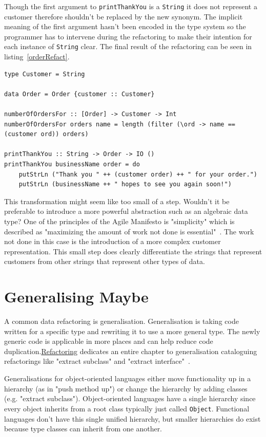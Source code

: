 Though the first argument to \texttt{printThankYou} is a \texttt{String} it does not represent a customer therefore shouldn't be replaced by the new synonym. The implicit meaning of the first argument hasn't been encoded in the type system so the programmer has to intervene during the refactoring to make their intention for each instance of \texttt{String} clear. The final result of the refactoring can be seen in listing~\ref{orderRefact}. 

\begin{lstlisting}[label=orderRefact,caption={The final result after adding a synonym for String.}]
type Customer = String

data Order = Order {customer :: Customer}

numberOfOrdersFor :: [Order] -> Customer -> Int
numberOfOrdersFor orders name = length (filter (\ord -> name == (customer ord)) orders)

printThankYou :: String -> Order -> IO ()
printThankYou businessName order = do
	putStrLn ("Thank you " ++ (customer order) ++ " for your order.")
	putStrLn (businessName ++ " hopes to see you again soon!")
\end{lstlisting}

 This transformation might seem like too small of a step. Wouldn't it be preferable to introduce a more powerful abstraction such as an algebraic data type? One of the principles of the Agile Manifesto is "simplicity" which is described as "maximizing the amount of work not done is essential"~\cite{agileManifesto}. The work not done in this case is the introduction of a more complex customer representation. This small step does clearly differentiate the strings that represent customers from other strings that represent other types of data.


\section{Generalising Maybe}
 
A common data refactoring is generalisation. Generalisation is taking code written for a specific type and rewriting it to use a more general type. The newly generic code is applicable in more places and can help reduce code duplication.\underline{Refactoring} dedicates an entire chapter to generalisation cataloguing refactorings like "extract subclass" and "extract interface"~\citep[pg. 319]{fowler}. 

Generalisations for object-oriented languages either move functionality up in a hierarchy (as in "push method up") or change the hierarchy by adding classes (e.g. "extract subclass"). Object-oriented languages have a single hierarchy since every object inherits from a root class typically just called \texttt{Object}. Functional languages don't have this single unified hierarchy, but smaller hierarchies do exist because type classes can inherit from one another. 

